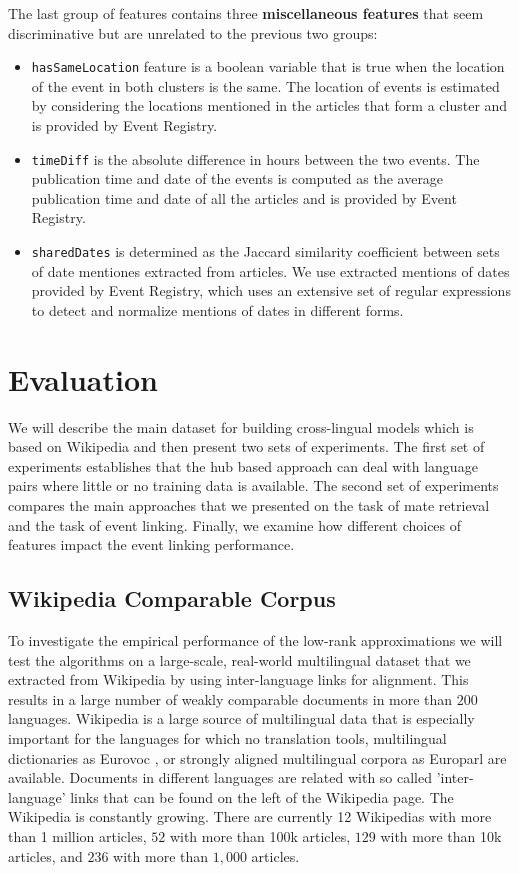 \documentclass[twoside,11pt]{article}
\begin{document}
The last group of features contains three {\bf miscellaneous features} that seem discriminative but are unrelated to the previous two groups:
\begin{itemize}
\item \texttt{hasSameLocation} feature is a boolean variable that is true when the location of the event in both clusters is the same. The location of events is estimated by considering the locations mentioned in the articles that form a cluster and is provided by Event Registry.
\item \texttt{timeDiff} is the absolute difference in hours between the two events. The publication time and date of the events is computed as the average publication time and date of all the articles and is provided by Event Registry.
\item \texttt{sharedDates} is determined as the Jaccard similarity coefficient between sets of date mentiones extracted from articles. We use extracted mentions of dates provided by Event Registry, which uses an extensive set of regular expressions to detect and normalize mentions of dates in different forms.
\end{itemize}


\section{Evaluation}\label{sec:evaluation}

We will describe the main dataset for building cross-lingual models which is based on Wikipedia and then present two sets of experiments. The first set of experiments
establishes that the hub based approach can deal with language pairs where little or no training data is available. The second set of experiments compares the main approaches
that we presented on the task of mate retrieval and the task of event linking. Finally, we examine how different choices of features impact the event linking performance.

\subsection{Wikipedia Comparable Corpus}

To investigate the empirical performance of the low-rank approximations we will test the algorithms on a large-scale, real-world multilingual dataset that we extracted from Wikipedia by using inter-language links for alignment. This  results in a large number of weakly comparable documents in more than $200$ languages. Wikipedia is a large source of multilingual data that is especially important for the languages for which no translation tools, multilingual dictionaries as Eurovoc \cite{eurovoc}, or strongly aligned multilingual corpora as Europarl \cite{europarl} are available. Documents in different languages are related with so called 'inter-language' links that can be found on the left of the Wikipedia page. The Wikipedia is constantly growing. There are currently 12 Wikipedias with more than 1 million %
 articles, $52$ with more than 100k %
 articles, $129$ with more than 10k articles, and $236$ with more than $1,000$ articles.
\end{document}
